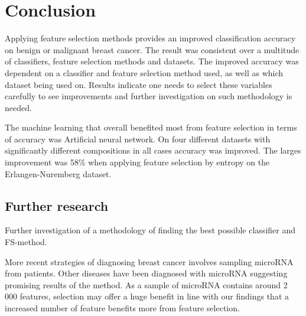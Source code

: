 \chapter{Conclusion}



Applying feature selection methods provides an improved classification accuracy on benign or malignant breast cancer. The result was consistent over a multitude of classifiers, feature selection methods and datasets. The improved accuracy was dependent on a classifier and feature selection method used, as well as which dataset being used on. Results indicate one needs to select these variables carefully to see improvements and further investigation on such methodology is needed.

The machine learning that overall benefited most from feature selection in terms of accuracy was Artificial neural network. On four different datasets with significantly different compositions in all cases accuracy was improved. The larges improvement was 58\% when applying feature selection by entropy on the Erlangen-Nuremberg dataset.


\section{Further research}

Further investigation of a methodology of finding the best possible classifier and FS-method.

More recent strategies of diagnosing breast cancer involves sampling microRNA from patients. Other diseases have been diagnosed with microRNA suggesting promising results of the method. As a sample of microRNA contains around 2 000 features, selection may offer a huge benefit in line with our findings that a increased number of feature benefits more from feature selection.
